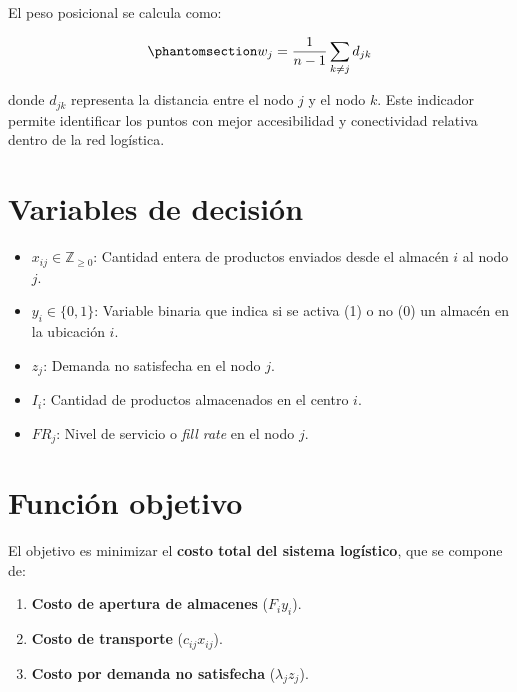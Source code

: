 \documentclass[
  spanish,
  us-letterpaper,
]{scrreprt}
\providecommand{\tightlist}{%
  \setlength{\itemsep}{0pt}\setlength{\parskip}{0pt}}
\numberwithin{equation}{chapter} %
\begin{document}
El peso posicional se calcula como:

\begin{equation}\phantomsection\label{eq-PBHE_completa}{
w_j = \frac{1}{n-1} \sum_{k \neq j} d_{jk} 
}\end{equation}

donde \(d_{jk}\) representa la distancia entre el nodo \(j\) y el nodo
\(k\). Este indicador permite identificar los puntos con mejor
accesibilidad y conectividad relativa dentro de la red logística.

\section{Variables de decisión}\label{variables-de-decisiuxf3n}

\begin{itemize}
\tightlist
\item
  \(x_{ij} \in \mathbb{Z}_{\geq 0}\): Cantidad entera de productos
  enviados desde el almacén \(i\) al nodo \(j\).\\
\item
  \(y_i \in \{0,1\}\): Variable binaria que indica si se activa (1) o no
  (0) un almacén en la ubicación \(i\).\\
\item
  \(z_j\): Demanda no satisfecha en el nodo \(j\).\\
\item
  \(I_i\): Cantidad de productos almacenados en el centro \(i\).\\
\item
  \(FR_j\): Nivel de servicio o \emph{fill rate} en el nodo \(j\).
\end{itemize}

\section{Función objetivo}\label{funciuxf3n-objetivo}

El objetivo es minimizar el \textbf{costo total del sistema logístico},
que se compone de:

\begin{enumerate}
\def\labelenumi{\arabic{enumi}.}
\tightlist
\item
  \textbf{Costo de apertura de almacenes} (\(F_i y_i\)).\\
\item
  \textbf{Costo de transporte} (\(c_{ij} x_{ij}\)).\\
\item
  \textbf{Costo por demanda no satisfecha} (\(\lambda_j z_j\)).
\end{enumerate}
\end{document}
